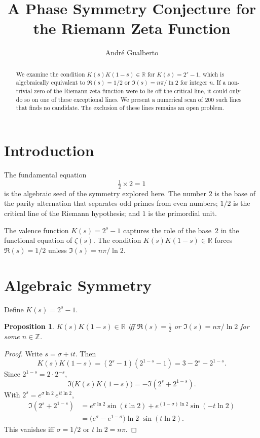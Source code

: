 \documentclass[12pt,a4paper]{article}
\title{A Phase Symmetry Conjecture for the Riemann Zeta Function}
\author{Andr\'e Gualberto}
\theoremstyle{plain}
\newtheorem{proposition}[theorem]{Proposition}
\begin{document}
\maketitle

\begin{abstract}
We examine the condition $K(s)K(1-s)\in\mathbb{R}$ for
$K(s)=2^s-1$, which is algebraically equivalent to
$\Re(s)=1/2$ or $\Im(s)=n\pi/\ln2$ for integer $n$.
If a non-trivial zero of the Riemann zeta function were to
lie off the critical line, it could only do so on one of
these exceptional lines.  We present a numerical scan of
200 such lines that finds no candidate.  The exclusion of
these lines remains an open problem.
\end{abstract}

\section{Introduction}

The fundamental equation
\[
\boxed{\tfrac12 \times 2 = 1}
\]
is the algebraic seed of the symmetry explored here.  The number
$2$ is the base of the parity alternation that separates odd primes
from even numbers; $1/2$ is the critical line of the Riemann
hypothesis; and $1$ is the primordial unit.

The valence function $K(s)=2^s-1$ captures the role of the
base~$2$ in the functional equation of $\zeta(s)$.
The condition $K(s)K(1-s)\in\mathbb{R}$ forces
$\Re(s)=1/2$ unless $\Im(s)=n\pi/\ln2$.

\section{Algebraic Symmetry}

Define $K(s)=2^s-1$.

\begin{proposition}
\label{prop:symmetry}
$K(s)K(1-s)\in\mathbb{R}$ iff $\Re(s)=\tfrac12$ or
$\Im(s)=n\pi/\ln2$ for some $n\in\mathbb{Z}$.
\end{proposition}
\begin{proof}
Write $s=\sigma+it$.  Then
\[
K(s)K(1-s) = (2^s-1)(2^{1-s}-1) = 3 - 2^s - 2^{1-s}.
\]
Since $2^{1-s}=2\cdot2^{-s}$,
\[
\Im\bigl(K(s)K(1-s)\bigr) = -\Im(2^s + 2^{1-s}).
\]
With $2^s = e^{\sigma\ln2}\,e^{it\ln2}$,
\begin{align*}
\Im(2^s + 2^{1-s})
&= e^{\sigma\ln2}\sin(t\ln2)
   + e^{(1-\sigma)\ln2}\sin(-t\ln2)\\
&= \bigl(e^{\sigma} - e^{1-\sigma}\bigr)\ln2\;\sin(t\ln2).
\end{align*}
This vanishes iff $\sigma=1/2$ or $t\ln2=n\pi$.
\end{proof}
\end{document}

